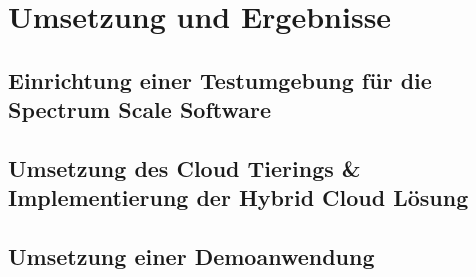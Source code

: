 \chapter{Umsetzung und Ergebnisse}\label{ch:realization}

\section{Einrichtung einer Testumgebung für die Spectrum Scale Software}
\section{Umsetzung des Cloud Tierings \& Implementierung der Hybrid Cloud Lösung}
\section{Umsetzung einer Demoanwendung}